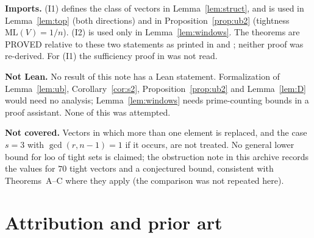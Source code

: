 \documentclass[11pt]{article}
\theoremstyle{remark}
\newcommand{\ML}{\mathrm{ML}}
\newcommand{\loo}{\mathrm{loo}}
\begin{document}
\textbf{Imports.} (I1) defines the class of vectors in Lemma~\ref{lem:struct}, and is used in Lemma~\ref{lem:top} (both directions) and in Proposition~\ref{prop:ub2} (tightness $\ML(V)=1/n$). (I2) is used only in Lemma~\ref{lem:windows}. The theorems are PROVED relative to these two statements as printed in \cite{GW06} and \cite{Dusart10}; neither proof was re-derived. For (I1) the sufficiency proof in \cite{GW06} was not read.

\textbf{Not Lean.} No result of this note has a Lean statement. Formalization of Lemma~\ref{lem:ub}, Corollary~\ref{cor:s2}, Proposition~\ref{prop:ub2} and Lemma~\ref{lem:D} would need no analysis; Lemma~\ref{lem:windows} needs prime-counting bounds in a proof assistant. None of this was attempted.

\textbf{Not covered.} Vectors in which more than one element is replaced, and the case $s=3$ with $\gcd(r,n-1)=1$ if it occurs, are not treated. No general lower bound for $\loo$ of tight sets is claimed; the obstruction note in this archive records the values for $70$ tight vectors and a conjectured bound, consistent with Theorems~A--C where they apply (the comparison was not repeated here).

\section{Attribution and prior art}\label{sec:attr}
\end{document}
